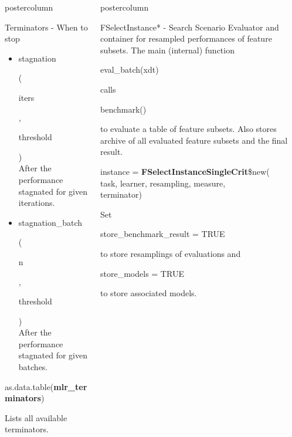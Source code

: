 \documentclass{beamer}
\newlength{\columnheight} %
\newcommand{\codeinline}[1]{\begin{codeboxinline}#1\end{codeboxinline}}
\begin{document}
\begin{frame}[fragile]{}
\begin{columns}
\begin{column}{.245\textwidth}
\begin{beamercolorbox}[center]{postercolumn}
\begin{minipage}{.98\textwidth}
{\begin{myblock}{Terminators - When to stop}
\begin{itemize}
							\item \codeinline{stagnation}
							(\codeinline{iters}, \codeinline{threshold})\\
							After the performance stagnated for given iterations.
							\item \codeinline{stagnation\_batch}
							(\codeinline{n}, \codeinline{threshold})\\
							After the performance stagnated for given batches.
						\end{itemize}
						\vspace{1em}
						\begin{codebox}
							as.data.table(\textbf{mlr\_terminators})
						\end{codebox}
						Lists all available terminators.
					\end{myblock}
						\vfill}
				\end{minipage}
			\end{beamercolorbox}
		\end{column}
		\begin{column}{.245\textwidth}
			\begin{beamercolorbox}[center]{postercolumn}
				\begin{minipage}{.98\textwidth}
					\parbox[t][\columnheight]{\textwidth}{
						\begin{myblock}{FSelectInstance* - Search Scenario}
							Evaluator and container for resampled performances of feature subsets.
							The main (internal) function \codeinline{eval\_batch(xdt)} calls \codeinline{benchmark()} to evaluate a table of feature subsets. 
							Also stores archive of all evaluated feature subsets and the final result.
							\\
							\begin{codeboxmultiline}[width=25cm]
								instance = \textbf{FSelectInstanceSingleCrit}\$new(\\
								\hspace*{1ex}task, learner, resampling, measure,\\
								terminator)
							\end{codeboxmultiline}
							Set \codeinline{store\_benchmark\_result = TRUE} to store resamplings of evaluations and \codeinline{store\_models = TRUE} to store associated models.\\

\end{myblock}}
\end{minipage}
\end{beamercolorbox}
\end{column}
\end{columns}
\end{frame}
\end{document}
